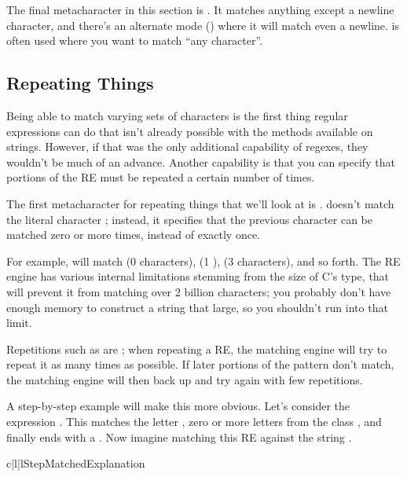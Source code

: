 \documentclass{howto}
\begin{document}
The final metacharacter in this section is .  It matches
anything except a newline character, and there's an alternate mode
() where it will match even a newline.  
is often used where you want to match ``any character''.  

\subsection{Repeating Things}

Being able to match varying sets of characters is the first thing
regular expressions can do that isn't already possible with the
methods available on strings.  However, if that was the only
additional capability of regexes, they wouldn't be much of an advance.
Another capability is that you can specify that portions of the RE
must be repeated a certain number of times.

The first metacharacter for repeating things that we'll look at is
\regexp{*}.  \regexp{*} doesn't match the literal character \samp{*};
instead, it specifies that the previous character can be matched zero
or more times, instead of exactly once.

For example,  will match  (0 
characters),  (1 ),  (3 
characters), and so forth.  The RE engine has various internal
limitations stemming from the size of C's  type, that will
prevent it from matching over 2 billion  characters; you
probably don't have enough memory to construct a string that large, so
you shouldn't run into that limit.

Repetitions such as \regexp{*} are ; when repeating a RE,
the matching engine will try to repeat it as many times as possible.
If later portions of the pattern don't match, the matching engine will
then back up and try again with few repetitions.

A step-by-step example will make this more obvious.  Let's consider
the expression .  This matches the letter
, zero or more letters from the class \code{[bcd]}, and
finally ends with a .  Now imagine matching this RE
against the string .  

\begin{tableiii}{c|l|l}{}{Step}{Matched}{Explanation}
\end{tableiii}
\end{document}
